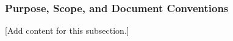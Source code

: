 
\subsubsection{Purpose, Scope, and Document Conventions}
\label{subsubsec:design_1_1_purpose_scope_conventions}

[Add content for this subsection.]

